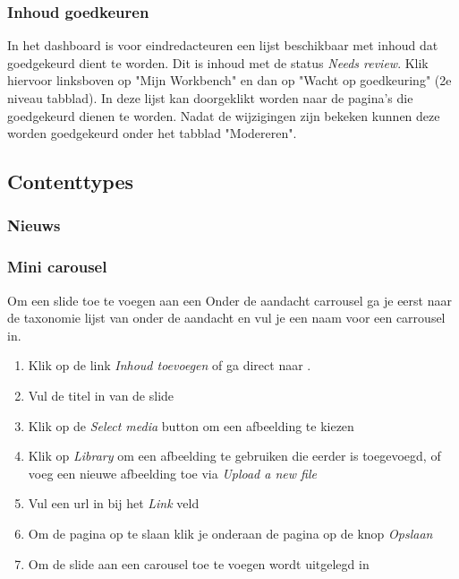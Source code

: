 \subsubsection{Inhoud goedkeuren}

In het dashboard is voor eindredacteuren een lijst beschikbaar met inhoud dat goedgekeurd dient te worden. Dit is inhoud met de status \emph{Needs review}. Klik hiervoor linksboven op "Mijn Workbench" en dan op "Wacht op goedkeuring" (2e niveau tabblad). In deze lijst kan doorgeklikt worden naar de pagina's die goedgekeurd dienen te worden. Nadat de wijzigingen zijn bekeken kunnen deze worden goedgekeurd onder het tabblad "Modereren".


\subsection{Contenttypes}

\subsubsection{Nieuws}

\subsubsection{Mini carousel}

Om een slide toe te voegen aan een Onder de aandacht carrousel ga je eerst naar de taxonomie lijst van onder de aandacht en vul je een naam voor een carrousel in.

\begin{enumerate}
\item Klik op de link \emph{Inhoud toevoegen} of ga direct naar .
\item Vul de titel in van de slide
\item Klik op de \emph{Select media} button om een afbeelding te kiezen
\item Klik op \emph{Library} om een afbeelding te gebruiken die eerder is toegevoegd,  of voeg een nieuwe afbeelding toe via \emph{Upload a new file}
\item Vul een url in bij het \emph{Link} veld
\item Om de pagina op te slaan klik je onderaan de pagina op de knop \emph{Opslaan}
\item Om de slide aan een carousel toe te voegen wordt uitgelegd in 
\end{enumerate}

